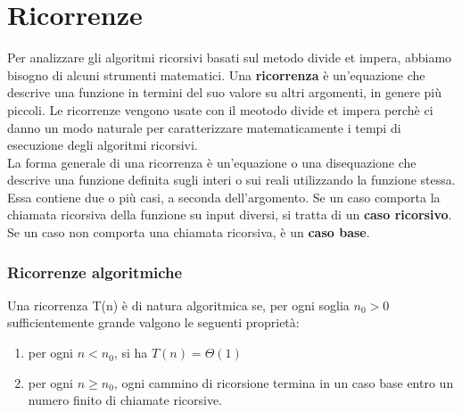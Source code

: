 \section{Ricorrenze}
Per analizzare gli algoritmi ricorsivi basati sul metodo divide et impera, abbiamo bisogno di alcuni strumenti matematici. Una \textbf{ricorrenza} è un'equazione che descrive una funzione in termini del suo valore su altri argomenti, in genere più piccoli. Le ricorrenze vengono usate con il meotodo divide et impera perchè ci danno un modo naturale per caratterizzare matematicamente i tempi di esecuzione degli algoritmi ricorsivi.\\
La forma generale di una ricorrenza è un'equazione o una  disequazione che descrive una funzione definita sugli interi o sui reali utilizzando la funzione stessa. Essa contiene due o più casi, a seconda dell'argomento. Se un caso comporta la chiamata ricorsiva della funzione su input diversi, si tratta di un \textbf{caso ricorsivo}. Se un caso non comporta una chiamata ricorsiva, è un \textbf{caso base}.

\subsubsection{Ricorrenze algoritmiche}
 Una ricorrenza T(n) è di natura algoritmica se, per ogni soglia $n_0>0$ sufficientemente grande valgono le seguenti proprietà:
 \begin{enumerate}
     \item per ogni $n<n_0$, si ha $T(n)=\Theta(1)$
     \item per ogni $n \ge n_0$, ogni cammino di ricorsione termina in un caso base entro un numero finito di chiamate ricorsive.
 \end{enumerate}

